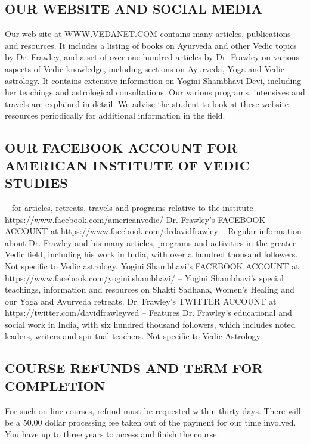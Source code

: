 \subsection{OUR WEBSITE AND SOCIAL MEDIA}
 

Our web site at WWW.VEDANET.COM contains many articles, publications and resources.
  It includes a listing of books on Ayurveda and other Vedic topics by Dr. Frawley, and a set of over one hundred articles by Dr. Frawley on various aspects of Vedic knowledge, including sections on Ayurveda, Yoga and Vedic astrology. It contains extensive information on Yogini Shambhavi Devi, including her teachings and astrological consultations. Our various programs, intensives and travels are explained in detail. We advise the student to look at these website resources periodically for additional information in the field.  

\subsection{OUR FACEBOOK ACCOUNT FOR AMERICAN INSTITUTE OF VEDIC STUDIES} – for articles, retreats, travels and programs relative to the institute – https://www.facebook.com/americanvedic/
Dr. Frawley’s FACEBOOK ACCOUNT at https://www.facebook.com/drdavidfrawley – Regular information about Dr. Frawley and his many articles, programs and activities in the greater Vedic field, including his work in India, with over a hundred thousand followers. Not specific to Vedic astrology.
Yogini Shambhavi’s FACEBOOK ACCOUNT at https://www.facebook.com/yogini.shambhavi/ – Yogini Shambhavi’s special teachings, information and resources on Shakti Sadhana, Women’s Healing and our Yoga and Ayurveda retreats.
 Dr. Frawley’s TWITTER ACCOUNT at https://twitter.com/davidfrawleyved –  Features Dr. Frawley’s educational and social work in India, with six hundred thousand followers, which includes noted leaders, writers and spiritual teachers. Not specific to Vedic Astrology.
 

\subsection{COURSE REFUNDS AND TERM FOR COMPLETION} For such on-line courses, refund must be requested within thirty days. There will be a 50.00 dollar processing fee taken out of the payment for our time involved. You have up to three years to access and finish the course.  

